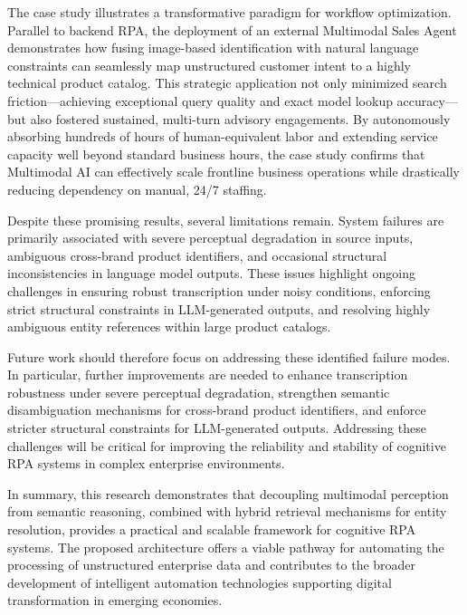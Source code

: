 The case study illustrates a transformative paradigm for workflow optimization. Parallel to backend RPA, the deployment of an external Multimodal Sales Agent demonstrates how fusing image-based identification with natural language constraints can seamlessly map unstructured customer intent to a highly technical product catalog. This strategic application not only minimized search friction—achieving exceptional query quality and exact model lookup accuracy—but also fostered sustained, multi-turn advisory engagements. By autonomously absorbing hundreds of hours of human-equivalent labor and extending service capacity well beyond standard business hours, the case study confirms that Multimodal AI can effectively scale frontline business operations while drastically reducing dependency on manual, 24/7 staffing.

Despite these promising results, several limitations remain. System failures are primarily associated with severe perceptual degradation in source inputs, ambiguous cross-brand product identifiers, and occasional structural inconsistencies in language model outputs. These issues highlight ongoing challenges in ensuring robust transcription under noisy conditions, enforcing strict structural constraints in LLM-generated outputs, and resolving highly ambiguous entity references within large product catalogs.

Future work should therefore focus on addressing these identified failure modes. In particular, further improvements are needed to enhance transcription robustness under severe perceptual degradation, strengthen semantic disambiguation mechanisms for cross-brand product identifiers, and enforce stricter structural constraints for LLM-generated outputs. Addressing these challenges will be critical for improving the reliability and stability of cognitive RPA systems in complex enterprise environments.

In summary, this research demonstrates that decoupling multimodal perception from semantic reasoning, combined with hybrid retrieval mechanisms for entity resolution, provides a practical and scalable framework for cognitive RPA systems. The proposed architecture offers a viable pathway for automating the processing of unstructured enterprise data and contributes to the broader development of intelligent automation technologies supporting digital transformation in emerging economies.

